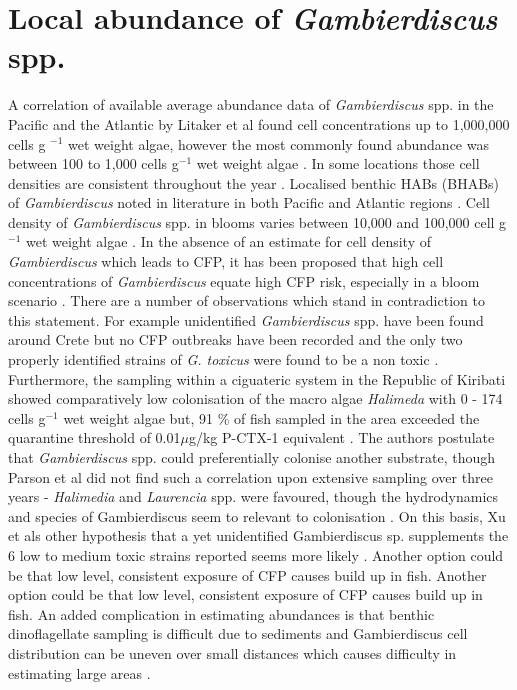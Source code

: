 \documentclass[12pt]{article}
\begin{document}
\section{Local abundance of \emph{Gambierdiscus} spp.}
A correlation of available average abundance data of \emph{Gambierdiscus} spp. in the Pacific and the Atlantic by Litaker et al found cell concentrations up to 1,000,000 cells g $^{-1}$ wet weight algae, however the most commonly found abundance was between 100 to 1,000 cells g$^{-1}$ wet weight algae \cite{litaker2010global}. In some locations those cell densities are consistent throughout the year \cite{chinain1999seasonal}.
Localised benthic HABs (BHABs) of \emph{Gambierdiscus} noted in literature in both Pacific and Atlantic regions \cite{nakajima1981toxicity,withers1984ciguatera,chinain1999seasonal,darius2007ciguatera}.
Cell density of \emph{Gambierdiscus} spp. in blooms varies between 10,000 and 100,000 cell g$^{-1}$ wet weight algae \cite{chinain1999seasonal}. In the absence of an estimate for cell density of \emph{Gambierdiscus} which leads to CFP, it has been proposed  that high cell concentrations of \emph{Gambierdiscus} equate high CFP risk, especially in a bloom scenario \cite{litaker2010global}. 
There are a number of observations which stand in contradiction to this statement. For example unidentified \emph{Gambierdiscus} spp. have been found around Crete but no CFP outbreaks have been recorded and the only two properly identified strains of \emph{G. toxicus} were found to be a non toxic \cite{caillaud2010update,chinain2010growth}.
Furthermore, the sampling within a ciguateric system in the Republic of Kiribati showed comparatively low colonisation of the macro algae \emph{Halimeda} with 0 - 174 cells g$^{-1}$ wet weight algae but, 91 \% of fish sampled in the area exceeded the quarantine threshold of 0.01$\mu$g/kg P-CTX-1 equivalent \cite{xu2014distribution,chan2011spatial}. The authors postulate that \emph{Gambierdiscus} spp. could preferentially colonise another substrate, though Parson et al did not find such a correlation upon extensive sampling over three years - \emph{Halimedia} and \emph{Laurencia} spp. were favoured, though the hydrodynamics and species of Gambierdiscus seem to relevant to colonisation \cite{parsonICHA}. On this basis, Xu et als other hypothesis that a yet unidentified Gambierdiscus sp. supplements the 6 low to medium toxic strains reported seems more likely \cite{xu2014distribution,bomber1988r}. Another option could be that low level, consistent exposure of CFP causes build up in fish.
Another option could be that low level, consistent exposure of CFP causes build up in fish. An added complication in estimating abundances is that benthic dinoflagellate sampling is difficult due to sediments and Gambierdiscus cell distribution can be uneven over small distances which causes difficulty in estimating large areas  \cite{lobel1988assessment,ballantine1988population,litaker2010global}.
\end{document}
